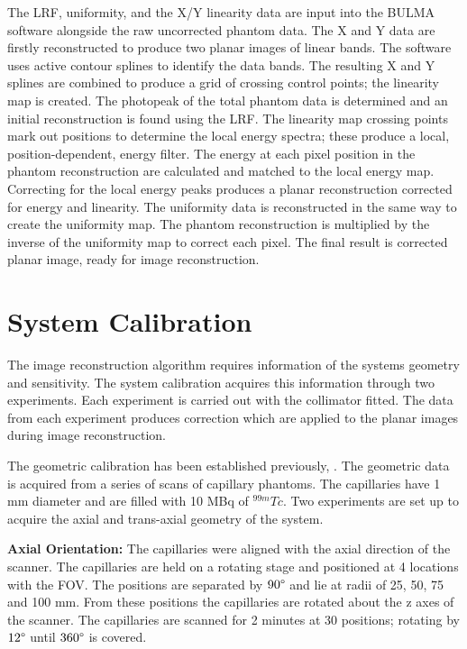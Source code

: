 The \acrshort{LRF}, uniformity, and the X/Y linearity data are input into the BULMA software alongside the raw uncorrected phantom data. The X and Y data are firstly reconstructed to produce two planar images of linear bands. The software uses active contour splines to identify the data bands. The resulting X and Y splines are combined to produce a grid of crossing control points; the linearity map is created. The photopeak of the total phantom data is determined and an initial reconstruction is found using the \acrshort{LRF}. The linearity map crossing points mark out positions to determine the local energy spectra; these produce a local, position-dependent, energy filter. The energy at each pixel position in the phantom reconstruction are calculated and matched to the local energy map. Correcting for the local energy peaks produces a planar reconstruction corrected for energy and linearity. The uniformity data is reconstructed in the same way to create the uniformity map. The phantom reconstruction is multiplied by the inverse of the uniformity map to correct each pixel. The final result is corrected planar image, ready for image reconstruction. 


\section{System Calibration}
The image reconstruction algorithm requires information of the systems geometry and sensitivity. The system calibration acquires this information through two experiments. Each experiment is carried out with the collimator fitted. The data from each experiment produces correction which are applied to the planar images during image reconstruction. 
 
The geometric calibration has been established previously, \cite{8340862}. The geometric data is acquired from a series of scans of capillary phantoms. The capillaries have 1 mm diameter and are filled with 10 MBq of $^{99m}Tc$. Two experiments are set up to acquire the axial and trans-axial geometry of the system. 

\textbf{Axial Orientation:} The capillaries were aligned with the axial direction of the scanner. The capillaries are held on a rotating stage and positioned at 4 locations with the \acrshort{FOV}. The positions are separated by $90\degree$ and lie at radii of 25, 50, 75 and 100 mm. From these positions the capillaries are rotated about the z axes of the scanner. The capillaries are scanned for 2 minutes at 30 positions; rotating by $12\degree$ until $360\degree$ is covered. 

